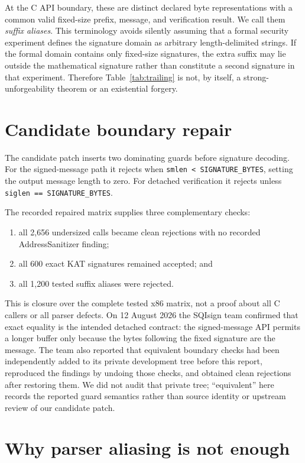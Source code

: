 \documentclass[11pt]{article}
\newcommand{\code}[1]{\texttt{#1}}
\begin{document}
At the C API boundary, these are distinct declared byte representations with a
common valid fixed-size prefix, message, and verification result.  We call
them \emph{suffix aliases}.  This terminology avoids silently assuming that a
formal security experiment defines the signature domain as arbitrary
length-delimited strings.  If the formal domain contains only fixed-size
signatures, the extra suffix may lie outside the mathematical signature rather
than constitute a second signature in that experiment.  Therefore
Table~\ref{tab:trailing} is not, by itself, a strong-unforgeability theorem or
an existential forgery.

\section{Candidate boundary repair}

The candidate patch inserts two dominating guards before signature decoding.
For the signed-message path it rejects when
\code{smlen < SIGNATURE\_BYTES}, setting the output message length to zero.
For detached verification it rejects unless
\code{siglen == SIGNATURE\_BYTES}.

The recorded repaired matrix supplies three complementary checks:

\begin{enumerate}
  \item all 2,656 undersized calls became clean rejections with no recorded
        AddressSanitizer finding;
  \item all 600 exact KAT signatures remained accepted; and
  \item all 1,200 tested suffix aliases were rejected.
\end{enumerate}

This is closure over the complete tested x86 matrix, not a proof about all C
callers or all parser defects.  On 12 August 2026 the SQIsign team confirmed
that exact equality is the intended detached contract: the signed-message API
permits a longer buffer only because the bytes following the fixed signature
are the message.  The team also reported that equivalent boundary checks had
been independently added to its private development tree before this report,
reproduced the findings by undoing those checks, and obtained clean rejections
after restoring them.  We did not audit that private tree; ``equivalent'' here
records the reported guard semantics rather than source identity or upstream
review of our candidate patch.

\section{Why parser aliasing is not enough}
\end{document}
